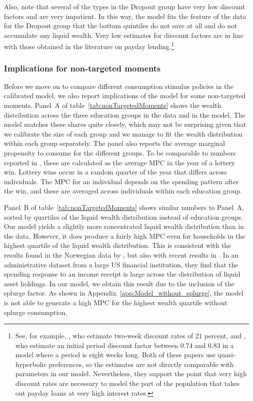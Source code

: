 \documentclass[\econtexRoot/HAFiscal]{subfiles}
\begin{document}
Also, note that several of the types in the Dropout group have very low discount factors and are very impatient.
In this way, the model fits the feature of the data for the Dropout group that the bottom quintiles do not save at all and do not accumulate any liquid wealth.
Very low estimates for discount factors are in line with those obtained in the literature on payday lending.\footnote{See, for example, \cite{skiba2008payday}, who estimate two-week discount rates of $21$ percent, and \cite{allcott2021high}, who estimate an initial period discount factor between $0.74$ and $0.83$ in a model where a period is eight weeks long.
Both of these papers use quasi-hyperbolic preferences, so the estimates are not directly comparable with parameters in our model.
Nevertheless, they support the point that very high discount rates are necessary to model the part of the population that takes out payday loans at very high interest rates.} 

\hypertarget{non-targeted-moments}{}\par\subsubsection{Implications for non-targeted moments} 
\notinsubfile{\label{sec:nonTargetedMoments}}

Before we move on to compare different consumption stimulus policies in the calibrated model, we also report implications of the model for some non-targeted moments.
Panel~A of table~\ref{tab:nonTargetedMoments} shows the wealth distribution across the three education groups in the data and in the model.
The model matches these shares quite closely, which may not be surprising given that we calibrate the size of each group and we manage to fit the wealth distribution within each group separately.
The panel also reports the average marginal propensity to consume for the different groups.
To be comparable to numbers reported in \citet{fagereng_mpc_2021}, these are calculated as the average MPC in the year of a lottery win.
Lottery wins occur in a random quarter of the year that differs across individuals.
The MPC for an individual depends on the spending pattern after the win, and these are averaged across individuals within each education group.


Panel~B of table~\ref{tab:nonTargetedMoments} shows similar numbers to Panel~A, sorted by quartiles of the liquid wealth distribution instead of education groups.
Our model yields a slightly more concentrated liquid wealth distribution than in the data.
However, it does produce a fairly high MPC even for households in the highest quartile of the liquid wealth distribution.
This is consistent with the results found in the Norwegian data by \citet{fagereng_mpc_2021}, but also with recent results in \citet{graham2024mental}.
In an administrative dataset from a large US financial institution, they find that the spending response to an income receipt is large across the distribution of liquid asset holdings.
In our model, we obtain this result due to the inclusion of the splurge factor.
As shown in Appendix~\ref{app:Model_without_splurge}, the model is not able to generate a high MPC for the highest wealth quartile without splurge consumption.
\end{document}
